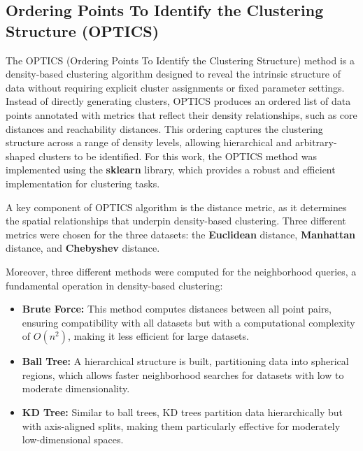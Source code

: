 \subsection{Ordering Points To Identify the Clustering Structure (OPTICS)}

The OPTICS (Ordering Points To Identify the Clustering Structure) method is a density-based clustering algorithm designed
to reveal the intrinsic structure of data without requiring explicit cluster assignments or fixed parameter settings.
Instead of directly generating clusters, OPTICS produces an ordered list of data points annotated with metrics that
reflect their density relationships, such as core distances and reachability distances. This ordering captures the
clustering structure across a range of density levels, allowing hierarchical and arbitrary-shaped clusters to be identified.
For this work, the OPTICS method was implemented using the \textbf{sklearn} library, which provides a robust and efficient implementation for clustering tasks.

A key component of OPTICS algorithm is the distance metric, as it determines the spatial relationships that underpin density-based
 clustering. Three different metrics were chosen for the three datasets: the \textbf{Euclidean} distance, \textbf{Manhattan}
  distance, and \textbf{Chebyshev} distance.

Moreover, three different methods were computed for the neighborhood queries, a fundamental operation in density-based
clustering:
\begin{itemize}
    \item \textbf{Brute Force:} This method computes distances between all point pairs, ensuring compatibility with all
    datasets but with a computational complexity of $O(n^2)$, making it less efficient for large datasets.
    \item \textbf{Ball Tree:} A hierarchical structure is built, partitioning data into spherical regions, which allows
    faster neighborhood searches for datasets with low to moderate dimensionality.
    \item \textbf{KD Tree:} Similar to ball trees, KD trees partition data hierarchically but with axis-aligned splits,
    making them particularly effective for moderately low-dimensional spaces.
\end{itemize}

